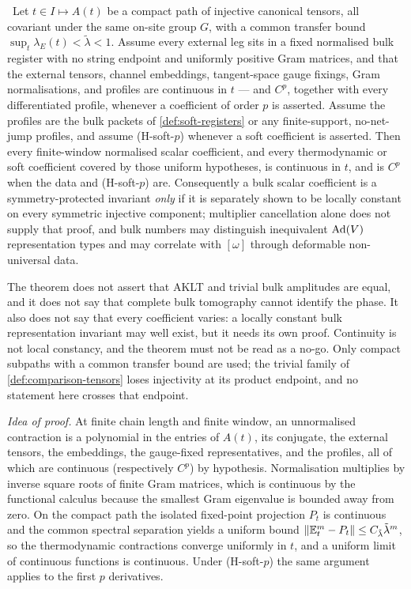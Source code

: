 \begin{theorem}\label{thm:bulk-continuity}
\statusProved\ Let $t\in I\mapsto A(t)$ be a compact path of injective
canonical tensors, all covariant under the same on-site group $G$, with a
common transfer bound $\sup_t\lambda_E(t)<\tilde\lambda<1$. Assume every
external leg sits in a fixed normalised bulk register with no string endpoint
and uniformly positive Gram matrices, and that the external tensors, channel
embeddings, tangent-space gauge fixings, Gram normalisations, and profiles are
continuous in $t$ --- and $C^{p}$, together with every differentiated profile,
whenever a coefficient of order $p$ is asserted. Assume the profiles are the
bulk packets of \cref{def:soft-registers} or any finite-support, no-net-jump
profiles, and assume (H-soft-$p$) whenever a soft coefficient is asserted.
Then every finite-window normalised scalar coefficient, and every
thermodynamic or soft coefficient covered by those uniform hypotheses, is
continuous in $t$, and is $C^{p}$ when the data and (H-soft-$p$) are.
Consequently a bulk scalar coefficient is a symmetry-protected invariant
\emph{only} if it is separately shown to be locally constant on every
symmetric injective component; multiplier cancellation alone does not supply
that proof, and bulk numbers may distinguish inequivalent $\operatorname{Ad}(V)$
representation types and may correlate with $[\omega]$ through deformable
non-universal data.
\end{theorem}

\begin{scope}
The theorem does not assert that AKLT and trivial bulk amplitudes are equal,
and it does not say that complete bulk tomography cannot identify the phase.
It also does not say that every coefficient varies: a locally constant bulk
representation invariant may well exist, but it needs its own proof.
Continuity is not local constancy, and the theorem must not be read as a
no-go. Only compact subpaths with a common transfer bound are used; the
trivial family of \cref{def:comparison-tensors} loses injectivity at its
product endpoint, and no statement here crosses that endpoint.
\end{scope}

\emph{Idea of proof.} At finite chain length and finite window, an
unnormalised contraction is a polynomial in the entries of $A(t)$, its
conjugate, the external tensors, the embeddings, the gauge-fixed
representatives, and the profiles, all of which are continuous (respectively
$C^{p}$) by hypothesis. Normalisation multiplies by inverse square roots of
finite Gram matrices, which is continuous by the functional calculus because
the smallest Gram eigenvalue is bounded away from zero. On the compact path
the isolated fixed-point projection $P_t$ is continuous and the common
spectral separation yields a uniform bound
$\lVert \mathbb{E}_t^{m}-P_t\rVert\le C_{\tilde\lambda}\tilde\lambda^{m}$, so the
thermodynamic contractions converge uniformly in $t$, and a uniform limit of
continuous functions is continuous. Under (H-soft-$p$) the same argument
applies to the first $p$ derivatives.

